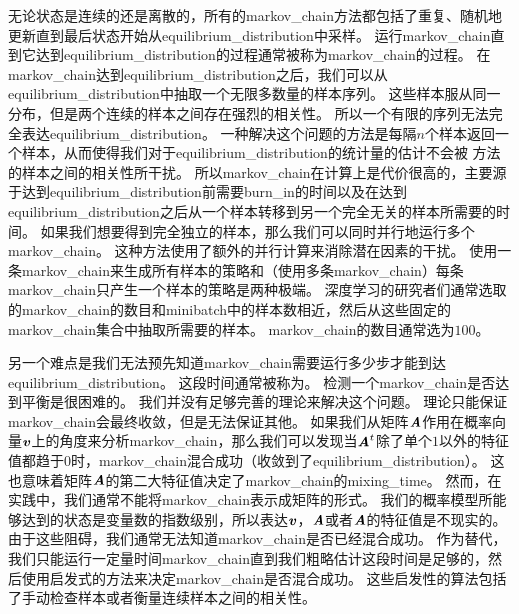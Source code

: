 无论状态是连续的还是离散的，所有的\gls{markov_chain}方法都包括了重复、随机地更新直到最后状态开始从\gls{equilibrium_distribution}中采样。 
运行\gls{markov_chain}直到它达到\gls{equilibrium_distribution}的过程通常被称为\gls{markov_chain}的过程。
在\gls{markov_chain}达到\gls{equilibrium_distribution}之后，我们可以从\gls{equilibrium_distribution}中抽取一个无限多数量的样本序列。 
这些样本服从同一分布，但是两个连续的样本之间存在强烈的相关性。 
所以一个有限的序列无法完全表达\gls{equilibrium_distribution}。
一种解决这个问题的方法是每隔$n$个样本返回一个样本，从而使得我们对于\gls{equilibrium_distribution}的统计量的估计不会被\,\,方法的样本之间的相关性所干扰。
所以\gls{markov_chain}在计算上是代价很高的，主要源于达到\gls{equilibrium_distribution}前需要\gls{burn_in}的时间以及在达到\gls{equilibrium_distribution}之后从一个样本转移到另一个完全无关的样本所需要的时间。
如果我们想要得到完全独立的样本，那么我们可以同时并行地运行多个\gls{markov_chain}。  
这种方法使用了额外的并行计算来消除潜在因素的干扰。 
使用一条\gls{markov_chain}来生成所有样本的策略和（使用多条\gls{markov_chain}）每条\gls{markov_chain}只产生一个样本的策略是两种极端。
深度学习的研究者们通常选取的\gls{markov_chain}的数目和\gls{minibatch}中的样本数相近，然后从这些固定的\gls{markov_chain}集合中抽取所需要的样本。 
\gls{markov_chain}的数目通常选为$100$。

另一个难点是我们无法预先知道\gls{markov_chain}需要运行多少步才能到达\gls{equilibrium_distribution}。 
这段时间通常被称为。
检测一个\gls{markov_chain}是否达到平衡是很困难的。
我们并没有足够完善的理论来解决这个问题。
理论只能保证\gls{markov_chain}会最终收敛，但是无法保证其他。
如果我们从矩阵$\boldsymbol{\mathit{A}}$作用在概率向量$\boldsymbol{\mathit{v}}$上的角度来分析\gls{markov_chain}，那么我们可以发现当$\boldsymbol{\mathit{A}}^t$除了单个$1$以外的特征值都趋于$0$时，\gls{markov_chain}混合成功（收敛到了\gls{equilibrium_distribution}）。
这也意味着矩阵$\boldsymbol{\mathit{A}}$的第二大特征值决定了\gls{markov_chain}的\gls{mixing_time}。
然而，在实践中，我们通常不能将\gls{markov_chain}表示成矩阵的形式。 
我们的概率模型所能够达到的状态是变量数的指数级别，所以表达$\boldsymbol{\mathit{v}}$，$\boldsymbol{\mathit{A}}$或者$\boldsymbol{\mathit{A}}$的特征值是不现实的。 
由于这些阻碍，我们通常无法知道\gls{markov_chain}是否已经混合成功。
作为替代，我们只能运行一定量时间\gls{markov_chain}直到我们粗略估计这段时间是足够的，然后使用启发式的方法来决定\gls{markov_chain}是否混合成功。
这些启发性的算法包括了手动检查样本或者衡量连续样本之间的相关性。 %



\section{}
\label{sec:gibbs_sampling}

